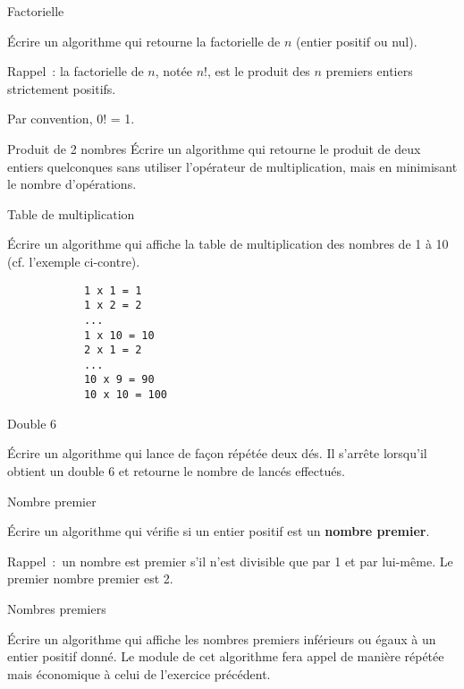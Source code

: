 	\begin{Exercice}{Factorielle}

		Écrire un algorithme qui retourne la factorielle de $n$ (entier positif ou
		nul). 
		
		Rappel~: la factorielle de $n$, notée $n$!, est le produit des $n$
		premiers entiers strictement positifs. 

		Par convention, 0! = 1.
	\end{Exercice}

	\begin{Exercice}{Produit de 2 nombres}
		Écrire un algorithme qui retourne le produit de deux entiers quelconques
		sans utiliser l’opérateur de multiplication, mais en minimisant le
		nombre d’opérations.
	\end{Exercice}

	\begin{Exercice}{Table de multiplication}

		\begin{minipage}[t]{10cm}
			Écrire un algorithme qui affiche la table de multiplication
			des nombres de 1 à 10
			(cf. l’exemple ci-contre).

		\end{minipage}
		\qquad
		\begin{minipage}[t]{4cm}
			\begin{verbatim}
			1 x 1 = 1
			1 x 2 = 2
			...
			1 x 10 = 10
			2 x 1 = 2
			...
			10 x 9 = 90
			10 x 10 = 100
			\end{verbatim}
		\end{minipage}		
	\end{Exercice}

	\begin{Exercice}{Double 6}

		Écrire un algorithme qui lance de façon répétée deux dés.
		Il s’arrête lorsqu’il obtient un double 6
		et retourne le nombre de lancés effectués.
	\end{Exercice}

	\begin{Exercice}{Nombre premier}

		Écrire un algorithme qui vérifie si un entier positif est un
		\textbf{nombre premier}. 

		Rappel~:~un nombre est premier s’il n’est divisible que par 1 et par
		lui-même. Le premier nombre premier est 2.
	\end{Exercice}

	\begin{Exercice}{Nombres premiers}

		Écrire un algorithme qui affiche les nombres premiers inférieurs ou
		égaux à un entier positif donné. Le module de cet algorithme fera appel
		de manière répétée mais économique à celui de l’exercice précédent.
	\end{Exercice}

